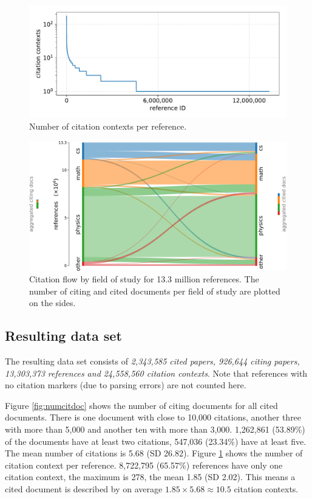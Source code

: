 \begin{figure}
  \centering
  \includegraphics[width=0.8\linewidth]{figures/dataset/citation_contexts_per_reference.pdf}
  \caption{Number of citation contexts per reference.}
  \label{fig:numcontref}
\end{figure}

\begin{figure}
  \centering
    \includegraphics[width=\textwidth]{figures/dataset/citation_relation_sankey.pdf}
  \caption[Citation flow by field of study for 13.3 million references.]{Citation flow by field of study for 13.3 million references. The number of citing and cited documents per field of study are plotted on the sides.}
  \label{fig:sankey}
\end{figure}

\subsection{Resulting data set}
The resulting data set consists of \emph{2,343,585 cited papers, 926,644 citing papers, 13,303,373 references and 24,558,560 citation contexts}. Note that references with no citation markers (due to parsing errors) are not counted here.

Figure \ref{fig:numcitdoc} shows the number of citing documents for all cited documents. There is one document with close to 10,000 citations, another three with more than 5,000 and another ten with more than 3,000. 1,262,861 (53.89\%) of the documents have at least two citations, 547,036 (23.34\%) have at least five. The mean number of citations is 5.68 (SD 26.82). Figure \ref{fig:numcontref} shows the number of citation context per reference. 8,722,795 (65.57\%) references have only one citation context, the maximum is 278, the mean 1.85 (SD 2.02). This means a cited document is described by on average $1.85 \times 5.68 \approx 10.5$ citation contexts.

